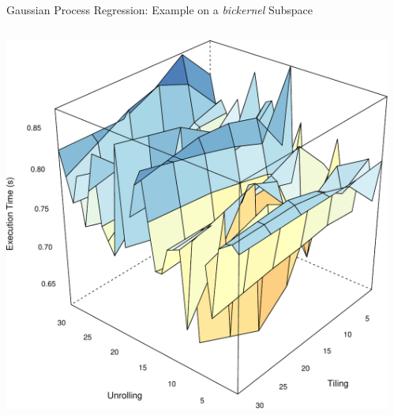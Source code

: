 \documentclass[10pt, compress, aspectratio=169, xcolor={table,usenames,dvipsnames}]{beamer}
\begin{document}
\begin{frame}[label={sec:orgf23593d}]{Gaussian Process Regression: Example on a \emph{bickernel} Subspace}
\begin{columns}
\begin{column}{0.5\columnwidth}
\begin{center}
\includegraphics[width=.95\columnwidth]{../../../img/bicgkernel_averaged_search_space.pdf}
\end{center}

\end{column}
\begin{column}{0.5\columnwidth}
\end{column}
\end{columns}
\end{frame}
\end{document}
